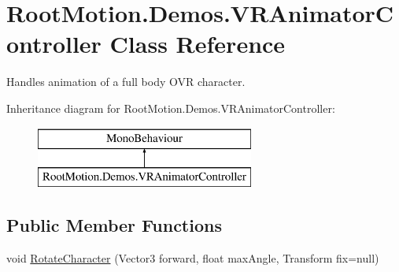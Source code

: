 \hypertarget{class_root_motion_1_1_demos_1_1_v_r_animator_controller}{}\section{Root\+Motion.\+Demos.\+V\+R\+Animator\+Controller Class Reference}
\label{class_root_motion_1_1_demos_1_1_v_r_animator_controller}


Handles animation of a full body O\+VR character.  


Inheritance diagram for Root\+Motion.\+Demos.\+V\+R\+Animator\+Controller\+:\begin{figure}[H]
\begin{center}
\leavevmode
\includegraphics[height=2.000000cm]{class_root_motion_1_1_demos_1_1_v_r_animator_controller}
\end{center}
\end{figure}
\subsection*{Public Member Functions}
\begin{DoxyCompactItemize}
\item 
void \mbox{\hyperlink{class_root_motion_1_1_demos_1_1_v_r_animator_controller_a62e3a4eb28348a470e9327343f29d7ef}{Rotate\+Character}} (Vector3 forward, float max\+Angle, Transform fix=null)
\end{DoxyCompactItemize}
